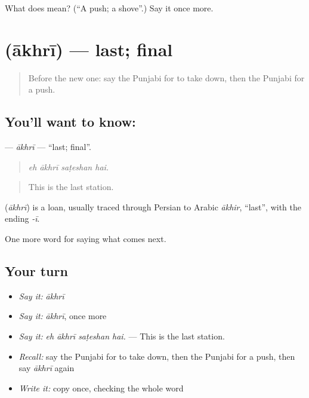 \begin{tcolorbox}[breakable,colback=teal!4,colframe=teal!35!black,title={Before you move on}]
What does  mean? (\textquotedblleft{}A push; a shove\textquotedblright{}.) Say it once more.
\end{tcolorbox}
\section[\texorpdfstring{\pa{ਆਖ਼ਰੀ} (ākhrī)}{ਆਖ਼ਰੀ (ākhrī)}]{ (ākhrī) — last; final}

\label{lesson:PA-C284-akhri}



\begin{quote}
Before the new one: say the Punjabi for to take down, then the Punjabi for a push.
\end{quote}

\subsection*{You'll want to know: }
\textbf{} — \emph{ākhrī} — \textquotedblleft{}last; final\textquotedblright{}.

\begin{quote}
   
\end{quote}

\begin{quote}
\emph{eh ākhrī saṭeshan hai.}
\end{quote}

\begin{quote}
This is the last station.
\end{quote}

\begin{cousinweb}
\textbf{} (\emph{ākhrī}) is a loan, usually traced through Persian to Arabic \emph{ākhir}, \textquotedblleft{}last\textquotedblright{}, with the ending \emph{-ī}.
\end{cousinweb}

\begin{grammarlens}[title={What you've built}]
One more word for saying what comes next.
\end{grammarlens}

\subsection*{Your turn}
\begin{itemize}
\raggedright
  \item \emph{Say it:} \emph{ākhrī}
  \item \emph{Say it:} \emph{ākhrī}, once more
  \item \emph{Say it:} \emph{eh ākhrī saṭeshan hai.} — This is the last station.
  \item \emph{Recall:} say the Punjabi for to take down, then the Punjabi for a push, then say \emph{ākhrī} again
  \item \emph{Write it:} copy \textbf{} once, checking the whole word
\end{itemize}


